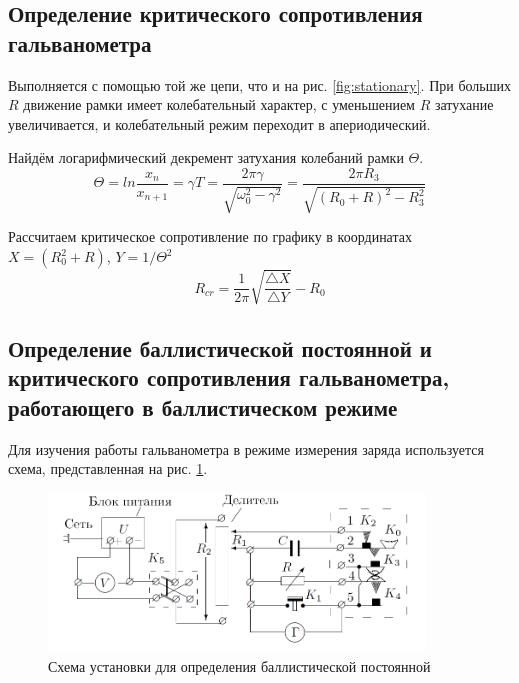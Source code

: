 \documentclass[a4paper,12pt]{article}
\begin{document}
  \subsection{Определение критического сопротивления гальванометра}
    Выполняется с помощью той же цепи, что и на рис. \ref{fig:stationary}. При больших $R$ движение рамки имеет колебательный характер, с уменьшением $R$ затухание увеличивается, и колебательный режим переходит в апериодический. \par
    Найдём логарифмический декремент затухания колебаний рамки  $\Theta$.
    \begin{equation}
        \Theta = ln\frac{x_n}{x_{n+1}} = \gamma T = \frac{2\pi \gamma}{\sqrt{\omega_0^2 - \gamma^2}} = \frac{2\pi R_3}{\sqrt{(R_0 + R)^2 - R_3^2}}
    \end{equation}

    Рассчитаем критическое сопротивление по графику в координатах $X = (R_0^2 + R)$, $Y = 1/\Theta^2$
    \begin{equation}
        R_{cr} = \frac{1}{2\pi}\sqrt{\frac{\triangle X}{\triangle Y}} - R_0
    \end{equation}

  \subsection{Определение баллистической постоянной и критического сопротивления гальванометра, работающего в баллистическом режиме}

    Для изучения работы гальванометра в режиме измерения заряда используется схема, представленная на рис. \ref{fig:ballistic}.

    \begin{figure}[h]
        \centering
        \includegraphics[width=10cm]{fig1.PNG}
        \caption{Схема установки для определения баллистической постоянной}
        \label{fig:ballistic}
    \end{figure}
\end{document}
